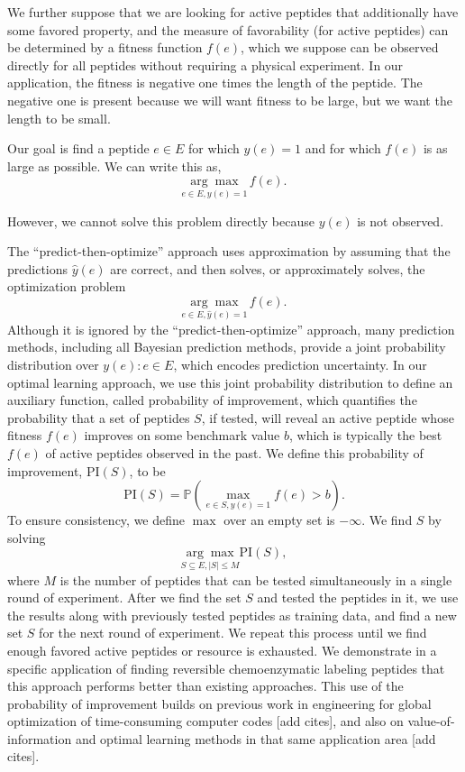 \documentclass[11pt]{article}
\newcommand{\Prob}{\mathbb{P}}
\newcommand{\PI}{\text{PI}}
\begin{document}
We further suppose that we are looking for active peptides that additionally have some
favored property, and the measure of favorability (for active peptides) can be
determined by a fitness function $f(e)$, which we suppose can be observed directly for all peptides without requiring a physical experiment. In our application, the fitness is negative one times the length of the peptide.  The negative one is present because we will want fitness to be large, but we want the length to be small.

Our goal is find a peptide $e\in E$ for which $y(e)=1$ and for which $f(e)$ is as large as possible.  We can write this as,
\begin{equation}
  \underset{e \in E, y(e) = 1}{\arg\max} \, f(e).
  \label{eq:general problem}
\end{equation}

However, we cannot solve this problem directly because $y(e)$ is not observed.


The \enquote{predict-then-optimize} approach uses approximation by assuming that the 
predictions $\hat{y}(e)$ are correct, and then solves, or approximately solves, the 
optimization problem 
\begin{equation*}
  \underset{e \in E, \hat{y}(e) = 1}{\arg\max} \, f(e).
  \label{}
\end{equation*}
Although it is ignored by the \enquote{predict-then-optimize} approach, many prediction methods, 
including all Bayesian prediction methods, provide a joint probability distribution over
$y(e): e \in E$, which encodes prediction uncertainty. In our optimal learning 
approach, we use this joint probability distribution to define an auxiliary 
function, called probability of improvement, which quantifies the probability 
that a set of peptides $S$, if tested, will reveal an active peptide whose fitness 
$f(e)$ improves on some benchmark value $b$, which is typically the best $f(e)$
of active peptides observed in the past. We define this probability of improvement, 
$\PI(S)$, to be
\begin{equation}
  \PI(S) = \Prob \left( \max_{e \in S, y(e)=1} f(e) > b \right).
  \label{}
\end{equation}
To ensure consistency, we define $\max$ over an empty set is $-\infty$.
We find $S$ by solving
\begin{equation}
  \underset{S \subseteq E, |S| \leq M}{\arg\max} \PI(S),
  \label{eq:opt PI}
\end{equation}
where $M$ is the number of peptides that can be tested simultaneously in a single round of experiment. 
After we find the set $S$ and tested the peptides in it, we use the results along with previously
tested peptides as training data, and find a new set $S$ for the next round of experiment. We repeat this
process until we find enough favored active peptides or resource is exhausted. We demonstrate
in a specific application of finding reversible chemoenzymatic labeling peptides
that this approach performs better than existing approaches.
This use of the probability of improvement builds on previous work in engineering 
for global optimization of time-consuming computer codes [add cites], and also on
value-of-information and optimal learning methods in that same application area 
[add cites].
\end{document}
